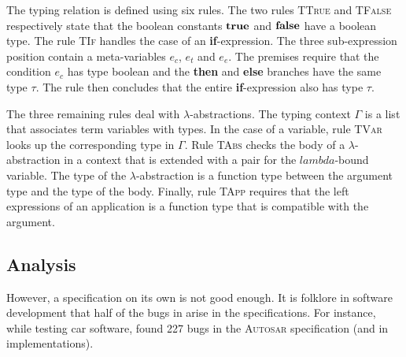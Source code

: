 {The typing relation is defined using six rules. The two rules \textsc{TTrue} and
\textsc{TFalse} respectively state that the boolean constants $\textbf{true}$ and
$\textbf{false}$ have a boolean type. The rule \textsc{TIf} handles the case of an
\textbf{if}-expression. The three sub-expression position contain a
meta-variables $e_c$, $e_t$ and $e_e$. The premises require that the condition
$e_c$ has type boolean and the \textbf{then} and \textbf{else} branches have the
same type $\tau$. The rule then concludes that the entire \textbf{if}-expression
also has type $\tau$.

The three remaining rules deal with $\lambda$-abstractions. The typing context
$\Gamma$ is a list that associates term variables with types. In the case of a
variable, rule \textsc{TVar} looks up the corresponding type in $\Gamma$. Rule
\textsc{TAbs} checks the body of a $\lambda$-abstraction in a context that is
extended with a pair for the $lambda$-bound variable. The type of the
$\lambda$-abstraction is a function type between the argument type and the type
of the body. Finally, rule \textsc{TApp} requires that the left expressions of
an application is a function type that is compatible with the argument.


\subsection{Analysis}\label{sec:intro:typesafety}


However, a specification on its own is not good enough. It is folklore in
software development that half of the bugs in arise in the specifications.  For
instance, while testing car software, \cite{arts2015testing} found 227 bugs in
the \textsc{Autosar} specification (and in implementations).










}
